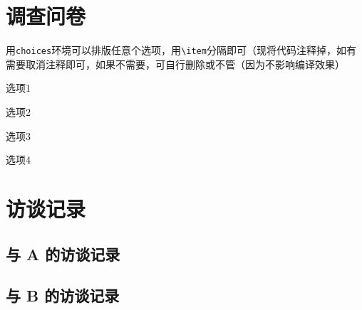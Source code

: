 \appendix


\chapter{调查问卷}

用\verb|choices|环境可以排版任意个选项，用\verb|\item|分隔即可（现将代码注释掉，如有需要取消注释即可，如果不需要，可自行删除或不管（因为不影响编译效果）

\begin{choices}
  \item 选项1
  \item 选项2
  \item 选项3
  \item 选项4
\end{choices}





\chapter{访谈记录}


\section{与 A 的访谈记录}

\section{与 B 的访谈记录}
